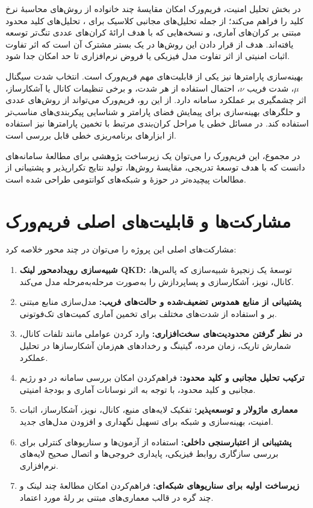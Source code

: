 در بخش تحلیل امنیت، فریم‌ورک امکان مقایسهٔ چند خانواده از روش‌های محاسبهٔ نرخ کلید را فراهم می‌کند؛ از جمله تحلیل‌های مجانبی کلاسیک برای ، تحلیل‌های کلید محدود مبتنی بر کران‌های آماری، و نسخه‌هایی که با هدف ارائهٔ کران‌های عددی تنگ‌تر توسعه یافته‌اند. هدف از قرار دادن این روش‌ها در یک بستر مشترک آن است که اثر تفاوت اثبات امنیتی از اثر تفاوت مدل فیزیکی یا فروض نرم‌افزاری تا حد امکان جدا شود.

بهینه‌سازی پارامترها نیز یکی از قابلیت‌های مهم فریم‌ورک است. انتخاب شدت سیگنال \(\mu\)، شدت فریب \(\nu\)، احتمال استفاده از هر شدت، و برخی تنظیمات کانال یا آشکارساز، اثر چشمگیری بر عملکرد سامانه دارد. از این رو، فریم‌ورک می‌تواند از روش‌های عددی و حلگرهای بهینه‌سازی برای پیمایش فضای پارامتر و شناسایی پیکربندی‌های مناسب‌تر استفاده کند. در مسائل خطی یا مراحل کران‌بندی مرتبط با تخمین پارامترها نیز استفاده از ابزارهای برنامه‌ریزی خطی قابل بررسی است.

در مجموع، این فریم‌ورک را می‌توان یک زیرساخت پژوهشی برای مطالعهٔ سامانه‌های  دانست که با هدف توسعهٔ تدریجی، مقایسهٔ روش‌ها، تولید نتایج تکرارپذیر و پشتیبانی از مطالعات پیچیده‌تر در حوزهٔ  و شبکه‌های کوانتومی طراحی شده است.

\section{مشارکت‌ها و قابلیت‌های اصلی فریم‌ورک}

مشارکت‌های اصلی این پروژه را می‌توان در چند محور خلاصه کرد:

\begin{enumerate}
	\item \textbf{شبیه‌سازی رویدادمحور لینک QKD:} توسعهٔ یک زنجیرهٔ شبیه‌سازی که پالس‌ها، کانال، نویز، آشکارسازی و پساپردازش را به‌صورت مرحله‌به‌مرحله مدل می‌کند.
	
	\item \textbf{پشتیبانی از منابع همدوس تضعیف‌شده و حالت‌های فریب:} مدل‌سازی منابع مبتنی بر  و استفاده از شدت‌های مختلف برای تخمین آماری کمیت‌های تک‌فوتونی.
	
	\item \textbf{در نظر گرفتن محدودیت‌های سخت‌افزاری:} وارد کردن عواملی مانند تلفات کانال، شمارش تاریک، زمان مرده، گیتینگ و رخدادهای هم‌زمان آشکارسازها در تحلیل عملکرد.
	
	\item \textbf{ترکیب تحلیل مجانبی و کلید محدود:} فراهم‌کردن امکان بررسی سامانه در دو رژیم مجانبی و کلید محدود، با توجه به اثر نوسانات آماری و بودجهٔ امنیتی.
	
	\item \textbf{معماری ماژولار و توسعه‌پذیر:} تفکیک لایه‌های منبع، کانال، نویز، آشکارساز، اثبات امنیت، بهینه‌سازی و شبکه برای تسهیل نگهداری و افزودن مدل‌های جدید.
	
	\item \textbf{پشتیبانی از اعتبارسنجی داخلی:} استفاده از آزمون‌ها و سناریوهای کنترلی برای بررسی سازگاری روابط فیزیکی، پایداری خروجی‌ها و اتصال صحیح لایه‌های نرم‌افزاری.
	
	\item \textbf{زیرساخت اولیه برای سناریوهای شبکه‌ای:} فراهم‌کردن امکان مطالعهٔ چند لینک و چند گره در قالب معماری‌های مبتنی بر رلهٔ مورد اعتماد.
\end{enumerate}

